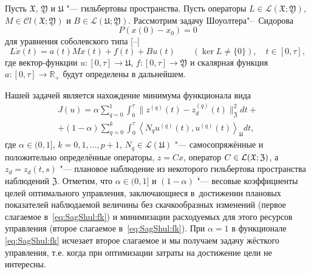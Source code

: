 
\date{23/XII/2013} %



\makerutitle

Пусть ${\mathfrak X}$, ${\mathfrak Y}$ и $\mathfrak U$ "--- гильбертовы пространства. 
Пусть операторы
${L}\in {\mathcal L}({\mathfrak X};{\mathfrak Y})$, $M\in {\mathcal C}l({\mathfrak X};{\mathfrak Y})$ и $B\in {\mathcal L}({\mathfrak U};{\mathfrak Y})$.
Рассмотрим задачу Шоуолтера"--~Сидорова \cite{SagShul:bib:SvZag}
\begin{equation}\label{eq:SagShul:SS}
P(x(0)-x_0)=0
\end{equation}
для уравнения соболевского типа [--]
\begin{equation}\label{eq:SagShul:upr}
L\dot{x}(t)=a(t)Mx(t)+f(t)+Bu(t)\qquad  (\ker L\ne\{0\}),\quad t\in[0,\tau],
\end{equation}
где  вектор-функции  $u:[0,\tau]\to{\mathfrak U}$, $f:[0,\tau]\to{\mathfrak Y}$ и скалярная функция $a:[0,\tau]\to{\mathbb R}_+$ будут определены в дальнейшем.


Нашей задачей является нахождение минимума функционала вида %
\begin{multline}\label{eq:SagShul:fk}
J(u)=\alpha\sum_{q=0}^1\int _0^\tau \bigl\|z^{(q)}(t)-z^{(q)}_d(t)\bigr\|^2_{\mathfrak Z}dt+ \\ 
+ (1-\alpha)
\sum_{q=0}^{k}\int _0^\tau\left\langle N_qu^{(q)}(t),u^{(q)}(t)\right\rangle_{\mathfrak U}dt,
\end{multline}
где $\alpha\in(0, 1]$, $k=0, 1,\dots, p+1$, $N_q\in{\mathcal L}(\mathfrak U)$  "--- самосопряжённые и положительно определённые операторы, $z=Cx$, оператор $C\in{\cal  L}({\mathfrak X};{\mathfrak Z})$, а
$z_d=z_d(t,s)$ "--- плановое наблюдение из некоторого гильбертова пространства наблюдений $\mathfrak Z$.
Отметим, что $\alpha\in(0, 1]$ и $(1-\alpha)$ "--- весовые коэффициенты целей оптимального управления, заключающиеся в~достижении плановых показателей наблюдаемой величины без скачкообразных изменений (первое слагаемое в~\eqref{eq:SagShul:fk}) и минимизации расходуемых для этого ресурсов управления (второе слагаемое в~\eqref{eq:SagShul:fk}). 
При $\alpha=1$ в функционале \eqref{eq:SagShul:fk} исчезает второе слагаемое и мы получаем задачу жёсткого управления, т.е. когда  при оптимизации затраты на достижение цели не интересны.


